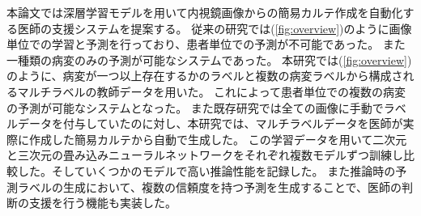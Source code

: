 本論文では深層学習モデルを用いて内視鏡画像からの簡易カルテ作成を自動化する医師の支援システムを提案する。
従来の研究では(\ref{fig:overview})のように画像単位での学習と予測を行っており、患者単位での予測が不可能であった。
また一種類の病変のみの予測が可能なシステムであった。
本研究では(\ref{fig:overview})のように、病変が一つ以上存在するかのラベルと複数の病変ラベルから構成されるマルチラベルの教師データを用いた。
これによって患者単位での複数の病変の予測が可能なシステムとなった。
また既存研究では全ての画像に手動でラベルデータを付与していたのに対し、本研究では、マルチラベルデータを医師が実際に作成した簡易カルテから自動で生成した。
この学習データを用いて二次元と三次元の畳み込みニューラルネットワークをそれぞれ複数モデルずつ訓練し比較した。そしていくつかのモデルで高い推論性能を記録した。
また推論時の予測ラベルの生成において、複数の信頼度を持つ予測を生成することで、医師の判断の支援を行う機能も実装した。
